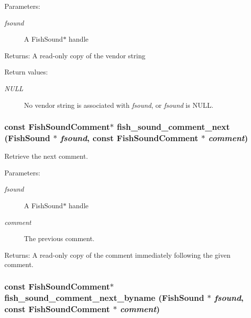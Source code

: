 \begin{Desc}
\item[Parameters:]
\begin{description}
\item[{\em fsound}]A Fish\-Sound$\ast$ handle \end{description}
\end{Desc}
\begin{Desc}
\item[Returns:]A read-only copy of the vendor string \end{Desc}
\begin{Desc}
\item[Return values:]
\begin{description}
\item[{\em NULL}]No vendor string is associated with {\em fsound\/}, or {\em fsound\/} is NULL. \end{description}
\end{Desc}
\subsubsection{\setlength{\rightskip}{0pt plus 5cm}const {\bf Fish\-Sound\-Comment}$\ast$ fish\_\-sound\_\-comment\_\-next ({\bf Fish\-Sound} $\ast$ {\em fsound}, const {\bf Fish\-Sound\-Comment} $\ast$ {\em comment})}\label{comments_8h_a2}


Retrieve the next comment. 

\begin{Desc}
\item[Parameters:]
\begin{description}
\item[{\em fsound}]A Fish\-Sound$\ast$ handle \item[{\em comment}]The previous comment. \end{description}
\end{Desc}
\begin{Desc}
\item[Returns:]A read-only copy of the comment immediately following the given comment. \end{Desc}
\subsubsection{\setlength{\rightskip}{0pt plus 5cm}const {\bf Fish\-Sound\-Comment}$\ast$ fish\_\-sound\_\-comment\_\-next\_\-byname ({\bf Fish\-Sound} $\ast$ {\em fsound}, const {\bf Fish\-Sound\-Comment} $\ast$ {\em comment})}\label{comments_8h_a4}


